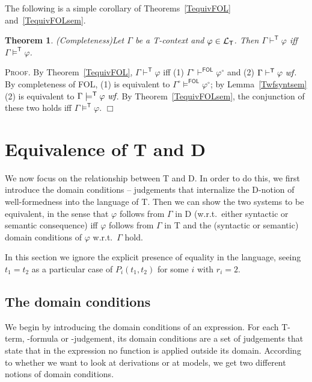 \documentclass{article}
\newtheorem{theorem}[definition]{Theorem}
\newenvironment{proof}{\smallskip\textsc{Proof.}}{\hspace*{\fill}$\Box$}
\newcommand{\D}{\textsf D}
\newcommand{\T}{\textsf T}
\newcommand{\FOL}{\textsf{FOL}}
\newcommand{\ofun}[1]{\ensuremath{{#1}^\circ}}
\newcommand{\wf}{\ \mbox{\em wf}}
\newcommand{\lang}[1]{\ensuremath{{\cal L}_{\mathsf{#1}}}}
\newcommand{\myvdash}[1]{\ensuremath{\vdash^{\mathsf{#1}}}}
\newcommand{\yields}[1]{\ensuremath{\models^{\mathsf{#1}}}}
\begin{document}
The following is a simple corollary of Theorems~\ref{TequivFOL}
and~\ref{TequivFOLsem}.
\begin{theorem}\emph{(Completeness)}\label{Tcomplete}
Let $\Gamma$ be a {\T}-context and $\varphi\in\lang{T}$.
Then $\Gamma\myvdash{T}\varphi$ iff $\Gamma\yields{T}\varphi$.
\end{theorem}
\begin{proof}
By Theorem~\ref{TequivFOL}, $\Gamma\myvdash{T}\varphi$ iff (1)
$\ofun\Gamma\myvdash{FOL}\ofun\varphi$ and (2)
$\Gamma\myvdash{T}\varphi\wf$.  By completeness of {\FOL}, (1) is
equivalent to $\ofun\Gamma\yields{FOL}\ofun\varphi$; by
Lemma~\ref{Twfsyntsem} (2) is equivalent to
$\Gamma\yields{T}\varphi\wf$.  By Theorem~\ref{TequivFOLsem}, the
conjunction of these two holds iff $\Gamma\yields T\varphi$.
\end{proof}


\section{Equivalence of {\T} and {\D}}

We now focus on the relationship between {\T} and {\D}.  In order to
do this, we first introduce the domain conditions -- judgements that
internalize the {\D}-notion of well-formedness into the language of
{\T}.  Then we can show the two systems to be equivalent, in the sense
that $\varphi$ follows from $\Gamma$ in {\D} (w.r.t.\ either syntactic
or semantic consequence) iff $\varphi$ follows from $\Gamma$ in {\T}
and the (syntactic or semantic) domain conditions of $\varphi$ w.r.t.\
$\Gamma$ hold.

In this section we ignore the explicit presence of equality in the
language, seeing $t_1=t_2$ as a particular case of $P_i(t_1,t_2)$ for
some $i$ with $r_i=2$.

\subsection{The domain conditions}

We begin by introducing the domain conditions of an expression.  For each
{\T}-term, -formula or -judgement, its domain conditions are a set of
judgements that state that in the expression no function is applied
outside its domain.  According to whether we want to look at derivations
or at models, we get two different notions of domain conditions.
\end{document}
